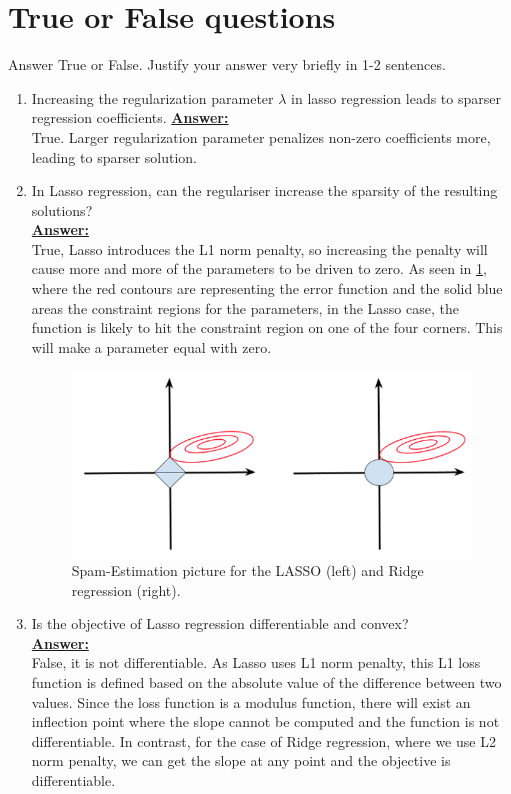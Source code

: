 \documentclass{article}
\newenvironment{qparts}{\begin{enumerate}[1.]}{\end{enumerate}}
\begin{document}
\section{True or False questions}
Answer True or False. Justify your answer very briefly in 1-2 sentences.
\begin{qparts}
\item Increasing the regularization parameter $\lambda$ in lasso regression leads to sparser regression coefficients.
\underline{\textbf{Answer:}}\\
True. Larger regularization parameter penalizes non-zero coefficients more, leading to
sparser solution.

\item In Lasso regression, can the regulariser increase the sparsity of the resulting solutions?\\
\underline{\textbf{Answer:}}\\
True, Lasso introduces the L1 norm penalty, so increasing the penalty will cause more and more of the parameters to be driven to zero. As seen in \cref{fig:hl2}, where the red contours are representing the error function and the solid blue areas the constraint regions for the parameters, in the Lasso case, the function is likely to hit the constraint region on one of the four corners. This will make a parameter equal with zero.
\begin{figure}[!htb]
    \centering
    \includegraphics[width=.6\textwidth]{fig/fig-han-4.PNG}
    \caption{Spam-Estimation picture for the LASSO (left) and Ridge regression (right).}
    \label{fig:hl2}
\end{figure}

\item Is the objective of Lasso regression differentiable and convex?\\
\underline{\textbf{Answer:}}\\
False, it is not differentiable. As Lasso uses L1 norm penalty, this L1 loss function is defined based on the absolute value of the difference between two values. Since the loss function is a modulus function, there will exist an inflection point where the slope cannot be computed and the function is not differentiable. In contrast, for the case of Ridge regression, where we use L2 norm penalty, we can get the slope at any point and the objective is differentiable.


\end{qparts}
\end{document}
